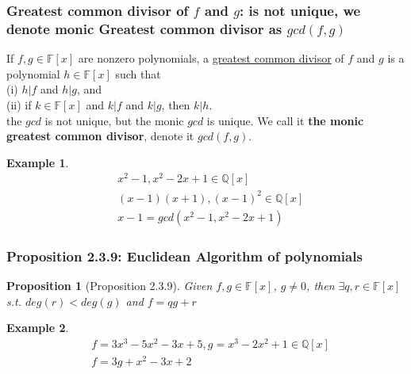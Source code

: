 \documentclass[11pt,a4paper]{article}
\newtheorem{proposition}{Proposition}
\newtheorem{example}{Example}
\begin{document}
\subsubsection{Greatest common divisor of $f$ and $g$: is not unique, we denote monic Greatest common divisor as $gcd(f,g)$}
If $f, g \in \mathbb{F}[x]$ are nonzero polynomials, a \underline{greatest common divisor} of $f$ and $g$ is a polynomial $h \in \mathbb{F}[x]$ such that\\
(i) $h|f$ and $h|g$, and\\
(ii) if $k\in\mathbb{F}[x]$ and $k|f$ and $k|g$, then $k|h$.\\
the $gcd$ is not unique, but the monic $gcd$ is unique. We call it \textbf{the monic greatest common divisor}, denote it $gcd(f,g)$.
\begin{example}
\begin{equation}
    \begin{aligned}
        &x^2 - 1, x^2 - 2x + 1 \in \mathbb{Q}[x]\\
        &(x - 1)(x + 1), (x - 1)^2 \in \mathbb{Q}[x]\\
        &x -1 = gcd(x^2 - 1, x^2 - 2x + 1)
    \end{aligned}
    \nonumber
\end{equation}
\end{example}

\subsubsection{Proposition 2.3.9: Euclidean Algorithm of polynomials}
\begin{proposition}[Proposition 2.3.9]
    Given $f, g \in \mathbb{F}[x]$, $g \neq 0$, then $\exists q, r \in \mathbb{F}[x]$ s.t.
    $deg(r ) < deg(g)$
    and $f = qg + r$
\end{proposition}
\begin{example}
\begin{equation}
    \begin{aligned}
        &f = 3x^3 - 5x^2 - 3x + 5, g = x^3 − 2x^2 + 1 \in \mathbb{Q}[x]\\
        &f=3g+x^2-3x+2
    \end{aligned}
    \nonumber
\end{equation}
\end{example}
\end{document}
